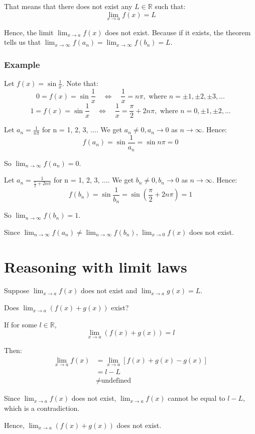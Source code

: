 \documentclass[11pt]{article}
\begin{document}
That means that there does not exist any \(L \in \mathbb{R}\) such that:
\[\lim_{x \rightarrow a} f(x) = L\]

Hence, the limit \(\lim_{x \rightarrow a} f(x)\) does not exist. Because if it exists, the theorem tells us that \(\lim_{x \rightarrow \infty} f(a_n) = \lim_{x \rightarrow \infty} f(b_n) = L\).

\newpage
\subsubsection{Example}
\label{sec:org7018eb8}
Let \(f(x) = \sin \frac{1}{x}\). Note that:
\[0 = f(x) = \sin \frac{1}{x} \quad \Leftrightarrow \quad \frac{1}{x} = n\pi, \text{ where } n = \pm 1, \pm 2, \pm 3, \ldots\]
\[1 = f(x) = \sin \frac{1}{x} \quad \Leftrightarrow \quad \frac{1}{x} = \frac{\pi}{2} + 2n\pi, \text{ where } n = 0, \pm 1, \pm 2, \ldots\]

Let \(a_n = \frac{1}{n\pi}\) for n = 1, 2, 3, \(\ldots\). We get \(a_n \neq 0, a_n \rightarrow 0\) as \(n \rightarrow \infty\). Hence:
\[f(a_n) = \sin \frac{1}{a_n} = \sin n\pi = 0\]

So \(\lim_{n \rightarrow \infty} f(a_n) = 0\).


Let \(a_n = \frac{1}{\frac{\pi}{2} + 2n\pi}\) for n = 1, 2, 3, \(\ldots\). We get \(b_n \neq 0, b_n \rightarrow 0\) as \(n \rightarrow \infty\). Hence:
\[f(b_n) = \sin \frac{1}{b_n} = \sin \left( \frac{\pi}{2} + 2n\pi \right) = 1\]

So \(\lim_{n \rightarrow \infty} f(b_n) = 1\).


Since \(\lim_{n \rightarrow \infty} f(a_n) \neq \lim_{n \rightarrow \infty} f(b_n)\), \(\lim_{x \rightarrow 0} f(x)\) does not exist.
\section{Reasoning with limit laws}
\label{sec:org972f5ac}
Suppose \(\lim_{x \rightarrow a} f(x)\) does not exist and \(\lim_{x \rightarrow a} g(x) = L\).


Does \(\lim_{x \rightarrow a} (f(x) + g(x))\) exist?


If for some \(l \in \mathbb{R}\),
\[\lim_{x \rightarrow a} (f(x) + g(x)) = l\]

Then:
\begin{align*}
\lim_{x \rightarrow a} f(x) &= \lim_{x \rightarrow a}[f(x) + g(x) - g(x)] \\
&= l - L \\
&\neq \text{undefined}
\end{align*}

Since \(\lim_{x \rightarrow a} f(x)\) does not exist, \(\lim_{x \rightarrow a} f(x)\) cannot be equal to \(l - L\), which is a contradiction.


Hence, \(\lim_{x \rightarrow a} (f(x) + g(x))\) does not exist.
\end{document}
